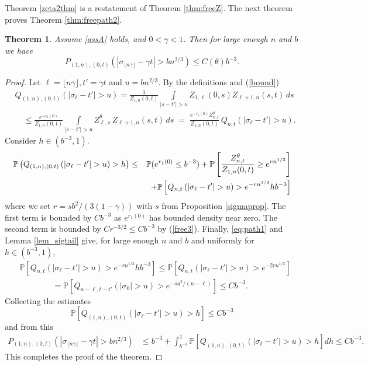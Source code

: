 \documentclass[11pt]{amsart}
\newtheorem{theorem}{\sc Theorem}[section]
\numberwithin{equation}{section}
\theoremstyle{remark}
\providecommand{\abs}[1]{\vert#1\vert}
\begin{document}
Theorem \ref{zeta2thm}  is a restatement of Theorem \ref{thm:freeZ}. The next theorem proves Theorem \ref{thm:freepath2}.

\begin{theorem}\label{thm:freepath}
Assume \eqref{assA} holds,  
 and  $0<\gamma<1$. Then for large enough $n$
 and $b$    we have
\begin{equation} 
P_{(1,n),(0,t)}\left(|\sigma_{\lfloor n \gamma\rfloor}-\gamma t|>b n^{2/3}   \right)\le C({\theta}) b^{-3}.
\end{equation} 
\end{theorem}
\begin{proof}
Let $\ell =\lfloor n \gamma\rfloor, t'=\gamma t$ and $u=b n^{2/3}$. By the definitions and   (\ref{bound})  
\begin{align*}
&Q_{(1,n),(0,t)}\left(| \sigma_{\ell }-t'|>u  \right)=
\frac1{Z_{1,n}(0,t)}   \int\limits_{\abs{s-t'}>u}  {Z_{1,\ell }(0,s) Z_{\ell +1,n}(s,t)} \,ds\\
 &\quad \le \frac{e^{-r_1(0)}}{Z_{1,n}(0,t)}   \int\limits_{\abs{s-t'}>u}  {Z^{\theta}_{\ell ,s}\, Z_{\ell +1,n}(s,t)} \,ds  \; = \; 
 \frac{e^{-r_1(0)}Z_{n,t}^{\theta}}{Z_{1,n}(0,t)} \,Q_{n,t}\left(| \sigma_{\ell }-t'|>u  \right) .
\end{align*} 
Consider  $h\in(b^{-3},1)$.  
\begin{eqnarray} {\nonumber} 
{\mathbb{P}}\left(Q_{(1,n),(0,t)}\left(| \sigma_{\ell }-t'|>u  \right)>h  \right)&\le& {\mathbb{P}}(e^{r_1(0)}\le b^{-3})+{\mathbb{P}}\left[
\frac{Z_{n,t}^{\theta}}{Z_{1,n}(0,t)} \ge e^{r n^{1/3}}
\right]\\
{\nonumber}&&+{\mathbb{P}}\left[  
Q_{n,t}\left(| \sigma_{\ell }-t'|>u  \right) >e^{-r n^{1/3}} h b^{-3}
\right]
\end{eqnarray} 
where we set $r=s b^2/(3(1-\gamma))$ with $s$ from Proposition \ref{sigmaprop}. 
The first term is bounded by $C b^{-3}$ as $e^{r_1(0)}$ has bounded density near zero. The second term is bounded by $C r^{-3/2}\le C b^{-3}$ by (\ref{free3}). Finally, \eqref{eq:path1} and Lemma \ref{lem_sigtail} give, for large enough $n$ and $b$ and uniformly for $h\in(b^{-3},1)$,  
\begin{align*}
&{\mathbb{P}}\left[   Q_{n,t}\left(| \sigma_{\ell }-t'|>u  \right) >e^{-r n^{1/3}} h b^{-3}
\right]\le {\mathbb{P}}\left[  
Q_{n,t}\left(| \sigma_{\ell }-t'|>u  \right) >e^{-2r n^{1/3}}
\right]\\
 &\qquad\qquad ={\mathbb{P}}\left[Q_{n-\ell ,t-t'}(|\sigma_0|>u)>e^{-s u^2/(n-\ell) }\right] 
\le   C b^{-3}.
\end{align*}
Collecting the estimates
\[
{\mathbb{P}}\left[Q_{(1,n),(0,t)}\left(| \sigma_{\ell }-t'|>u  \right)>h  \right]\le C  b^{-3}
\]
and from this 
\begin{align*}
P_{(1,n),(0,t)}\left(|\sigma_{\lfloor n \gamma\rfloor}-\gamma t|>b n^{2/3}   \right)&\le b^{-3}+\int_{b^{-3}}^1 {\mathbb{P}}\left[Q_{(1,n),(0,t)}\left(| \sigma_{\ell }-t'|>u  \right)>h  \right] dh\le C b^{-3}.
\end{align*}
This completes the proof of the theorem.
\end{proof}




\end{document}
